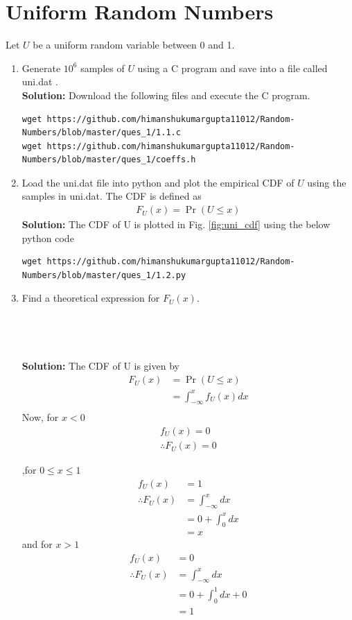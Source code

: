 \documentclass[journal,12pt,twocolumn]{IEEEtran}
\renewcommand\thesection{\arabic{section}}
\providecommand{\pr}[1]{\ensuremath{\Pr\left(#1\right)}}
\theoremstyle{remark}
\newcommand{\solution}{\noindent \textbf{Solution: }}
\numberwithin{equation}{section}
\begin{document}
\section{Uniform Random Numbers}
Let $U$ be a uniform random variable between 0 and 1.
\begin{enumerate}[label=\thesection.\arabic*
,ref=\thesection.\theenumi]
\item Generate $10^6$ samples of $U$ using a C program and save into a file called uni.dat .
\\
\solution Download the following files and execute the  C program.
\begin{lstlisting}
wget https://github.com/himanshukumargupta11012/Random-Numbers/blob/master/ques_1/1.1.c
wget https://github.com/himanshukumargupta11012/Random-Numbers/blob/master/ques_1/coeffs.h
\end{lstlisting}
%
\item
Load the uni.dat file into python and plot the empirical CDF of $U$ using the samples in uni.dat. The CDF is defined as
\begin{align}
F_{U}(x) = \pr{U \le x}
\end{align}
\solution The CDF of U is plotted in Fig. \ref{fig:uni_cdf}
using the below python code
\begin{lstlisting}
wget https://github.com/himanshukumargupta11012/Random-Numbers/blob/master/ques_1/1.2.py
\end{lstlisting}
%
\item
Find a  theoretical expression for $F_{U}(x)$.
\\
\\
\\
\\
\\

\solution 
The CDF of U is given by
\begin{align}
	F_U(x)&=\pr{ U\leq x}\\
	&=\int_{-\infty}^x f_U(x)dx\\
\end{align}
Now, for $x<0$
\begin{align}
	f_U(x)=0\\
\therefore F_U(x)=0
\end{align}


,for $0\leq x \leq1$
\begin{align}
	f_U(x)&=1\\
\therefore F_U(x)&=\int_{-\infty}^x dx\\
	&=0+\int_{0}^x dx\\
	&=x
\end{align}
and for $x>1$
\begin{align}
	f_U(x)&=0\\
\therefore F_U(x)&=\int_{-\infty}^x dx\\
	&=0+\int_{0}^1 dx+0\\
	&=1
\end{align}


\end{enumerate}
\end{document}
